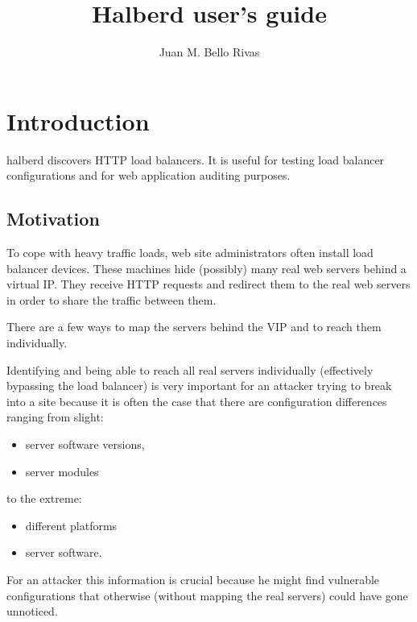 \documentclass[a4paper]{book}
\begin{document}
\title{Halberd user's guide}
\author{Juan M. Bello Rivas}
\maketitle

\tableofcontents


\chapter{Introduction}

halberd discovers HTTP load balancers. It is useful for testing load balancer
configurations and for web application auditing purposes. 

\section{Motivation}

To cope with heavy traffic loads, web site administrators often install load
balancer devices. These machines hide (possibly) many real web servers behind
a virtual IP. They receive HTTP requests and redirect them to the real web
servers in order to share the traffic between them.

There are a few ways to map the servers behind the VIP and to reach them
individually.

Identifying and being able to reach all real servers individually (effectively
bypassing the load balancer) is very important for an attacker trying to break
into a site because it is often the case that there are configuration
differences ranging from slight:

\begin{itemize}
  \item server software versions,
  \item server modules
\end{itemize}

to the extreme:

\begin{itemize}
  \item different platforms
  \item server software.
\end{itemize}

For an attacker this information is crucial because he might find vulnerable
configurations that otherwise (without mapping the real servers) could have
gone unnoticed.
\end{document}
